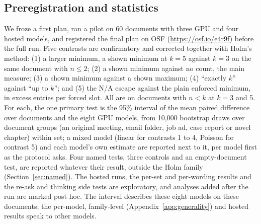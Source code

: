 \subsection{Preregistration and statistics}
\label{sec:prereg}

We froze a first plan, ran a pilot on 60 documents with three GPU and four hosted models, and registered the final plan on OSF (\url{https://osf.io/e4r9f}) before the full run.
Five contrasts are confirmatory and corrected together with Holm's method: (1) a larger minimum, a shown minimum at $k = 5$ against $k = 3$ on the same document with $n \leq 2$; (2) a shown minimum against no count, the main measure; (3) a shown minimum against a shown maximum; (4) ``exactly $k$'' against ``up to $k$''; and (5) the N/A escape against the plain enforced minimum, in excess entries per forced slot.
All are on documents with $n < k$ at $k = 3$ and 5.
For each, the one primary test is the 95\% interval of the mean paired difference over documents and the eight GPU models, from 10,000 bootstrap draws over document groups (an original meeting, email folder, job ad, case report or novel chapter) within set; a mixed model (linear for contrasts 1 to 4, Poisson for contrast 5) and each model's own estimate are reported next to it, per model first as the protocol asks.
Four named tests, three controls and an empty-document test, are reported whatever their result, outside the Holm family (Section~\ref{sec:named}).
The hosted runs, the per-set and per-wording results and the re-ask and thinking side tests are exploratory, and analyses added after the run are marked post hoc.
The interval describes these eight models on these documents; the per-model, family-level (Appendix~\ref{app:generality}) and hosted results speak to other models.
